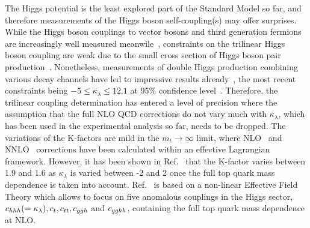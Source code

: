 The Higgs potential is the least explored part of the Standard Model so far, and therefore measurements of the Higgs boson self-coupling(s) may offer surprises.
While the Higgs boson couplings to vector bosons and third generation fermions are increasingly well measured meanwile~\cite{Khachatryan:2016vau,ATLAS:2018doi,CMS-PAS-HIG-17-031}, constraints on the trilinear Higgs boson coupling are weak due to the small cross section of Higgs boson pair production~\cite{Glover:1987nx,Dawson:1998py,Baglio:2012np,Frederix:2014hta}.
Nonetheless, measurements of double Higgs production combining various decay channels have led to impressive results already~\cite{CMS-PAS-HIG-17-030,ATLAS-CONF-2018-043}, 
the most recent constraints being $-5\leq \kappa_\lambda\leq 12.1$
 at 95\% confidence level~\cite{ATLAS-CONF-2018-043}.
Therefore, the trilinear coupling determination has entered a level of precision where the assumption that the full NLO QCD corrections do not vary much with $\kappa_\lambda$, which has been used in the experimental analysis so far, needs to be dropped.
The variations of the K-factors are mild in the $m_t\to \infty$ limit, where NLO~\cite{Grober:2015cwa,Grober:2017gut} and NNLO~\cite{deFlorian:2017qfk} corrections have been calculated within an effective Lagrangian framework.
However, it has been shown in Ref.~\cite{Buchalla:2018yce} that the K-factor varies between 1.9 and 1.6 as $\kappa_\lambda$ is varied between -2 and 2 once the full top quark mass dependence is taken into account. 
Ref.~\cite{Buchalla:2018yce} is based on a non-linear Effective Field Theory which allows to focus on five anomalous couplings in the Higgs sector, $c_{hhh}(=\kappa_\lambda), c_{t},c_{tt},c_{ggh}$ and $c_{gghh}$, containing the full top quark mass dependence at NLO.


